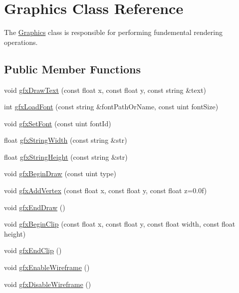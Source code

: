 \hypertarget{class_graphics}{\section{Graphics Class Reference}
\label{class_graphics}
}


The \hyperlink{class_graphics}{Graphics} class is responsible for performing fundemental rendering operations.  


\subsection*{Public Member Functions}
\begin{DoxyCompactItemize}
\item 
void \hyperlink{class_graphics_a8f622d0db9014c54d7bdc37f9cb4a49a}{gfx\-Draw\-Text} (const float x, const float y, const string \&text)
\item 
int \hyperlink{class_graphics_a0d7bac934882fe3a33797c231cd83ce4}{gfx\-Load\-Font} (const string \&font\-Path\-Or\-Name, const uint font\-Size)
\item 
void \hyperlink{class_graphics_aeb86cbfdc5f98849dad77316e835ac6c}{gfx\-Set\-Font} (const uint font\-Id)
\item 
float \hyperlink{class_graphics_aa915b255eba699cf4c3aa9a4498a5ab0}{gfx\-String\-Width} (const string \&str)
\item 
float \hyperlink{class_graphics_a5866b23d270178dd7f2856fd795ad42d}{gfx\-String\-Height} (const string \&str)
\item 
void \hyperlink{class_graphics_ae925edf6f7d9efda6d94e56ebe858935}{gfx\-Begin\-Draw} (const uint type)
\item 
void \hyperlink{class_graphics_a70c6cf4503b69f16ff1b49d8a5410ece}{gfx\-Add\-Vertex} (const float x, const float y, const float z=0.\-0f)
\item 
void \hyperlink{class_graphics_af286ffa2faeadbfe7f72a17a43b1fe0d}{gfx\-End\-Draw} ()
\item 
void \hyperlink{class_graphics_a9c0bf7b24d813a5e31013b6e18f0f3c0}{gfx\-Begin\-Clip} (const float x, const float y, const float width, const float height)
\item 
void \hyperlink{class_graphics_af4a0cc5869601b4055ad60556fe29792}{gfx\-End\-Clip} ()
\item 
void \hyperlink{class_graphics_ab06d4f50a5567b91702d0e3b71a36b0c}{gfx\-Enable\-Wireframe} ()
\item 
void \hyperlink{class_graphics_ada9df052df0be7d1996827a28dbc54cd}{gfx\-Disable\-Wireframe} ()

\end{DoxyCompactItemize}
